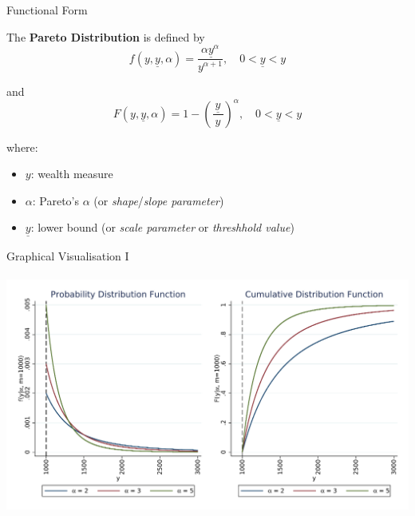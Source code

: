 \documentclass[ignorenonframetext,]{beamer}
\providecommand{\tightlist}{%
  \setlength{\itemsep}{0pt}\setlength{\parskip}{0pt}}
\begin{document}
\begin{frame}{Functional Form}
\protect\hypertarget{functional-form}{}

The \textbf{Pareto Distribution} is defined by
\[f(y, \underline y, \alpha) = \frac{\alpha \underline y^\alpha}
{y^{\alpha+1}} , \quad 0 < \underline y < y\]

and
\[F(y, \underline y, \alpha ) = 1 - \left( \frac{~\underline y~}{y}   \right)^{\alpha} , \quad 0 < \underline y < y\]

where:

\begin{itemize}
\tightlist
\item
  \(y\): wealth measure
\item
  \(\alpha\): Pareto's \(\alpha\) (or \emph{shape}/\emph{slope
  parameter})
\item
  \(\underline y\): lower bound (or \emph{scale parameter} or
  \emph{threshhold value})
\end{itemize}

\end{frame}

\begin{frame}{Graphical Visualisation I}
\protect\hypertarget{graphical-visualisation-i}{}

\includegraphics[width=\textwidth,height=3.125in]{./graphs/04_paretoDistGraphs.pdf}


\end{frame}
\end{document}

